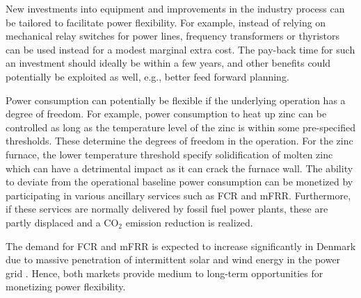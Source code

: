 \documentclass[conference]{IEEEtran}
\begin{document}

New investments into equipment and improvements in the industry process can be tailored to facilitate power flexibility. For example, instead of relying on mechanical relay switches for power lines, frequency transformers or thyristors can be used instead for a modest marginal extra cost. The pay-back time for such an investment should ideally be within a few years, and other benefits could potentially be exploited as well, e.g., better feed forward planning.



Power consumption can potentially be flexible if the underlying operation has a  degree of freedom. For example, power consumption to heat up zinc can be controlled as long as the temperature level of the zinc is within some pre-specified thresholds. These determine the degrees of freedom in the operation. For the zinc furnace, the lower temperature threshold specify solidification of molten zinc which can have a detrimental impact as it can crack the furnace wall.
%
The ability to deviate from the operational baseline power consumption can be monetized by participating in various ancillary services such as FCR and mFRR. Furthermore, if these services are normally delivered by fossil fuel power plants, these are partly displaced and a CO$_{2}$ emission reduction is realized.

The demand for FCR and mFRR is expected to increase significantly in Denmark due to massive penetration of intermittent solar and wind energy in the power grid \cite{energinet:scenario_report_2022}. Hence, both markets provide medium to long-term opportunities for monetizing power flexibility.
\end{document}
